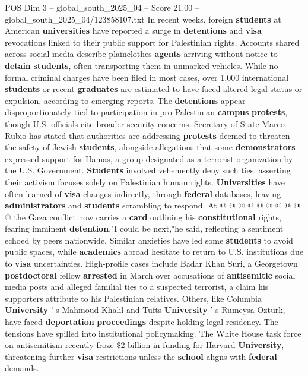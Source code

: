 \begin{textsample}{POS Dim 3 – global\_south\_2025\_04 – Score 21.00 – global\_south\_2025\_04/123858107.txt}  \label{ex:f3_pos_118}
In recent weeks, foreign \textbf{students} at American \textbf{universities} have reported a surge in \textbf{detentions} and \textbf{visa} revocations linked to their public support for Palestinian rights.
Accounts shared across social media describe plainclothes \textbf{agents} arriving without notice to \textbf{detain} \textbf{students}, often transporting them in unmarked vehicles.
While no formal criminal charges have been filed in most cases, over 1,000 international \textbf{students} or recent \textbf{graduates} are estimated to have faced altered legal status or expulsion, according to emerging reports.
The \textbf{detentions} appear disproportionately tied to participation in pro-Palestinian \textbf{campus} \textbf{protests}, though U.S. officials cite broader security concerns.
Secretary of State Marco Rubio has stated that authorities are addressing \textbf{protests} deemed to threaten the safety of Jewish \textbf{students}, alongside allegations that some \textbf{demonstrators} expressed support for Hamas, a group designated as a terrorist organization by the U.S.
Government. \textbf{Students} involved vehemently deny such ties, asserting their activism focuses solely on Palestinian human rights. \textbf{Universities} have often learned of \textbf{visa} changes indirectly, through \textbf{federal} databases, leaving \textbf{administrators} and \textbf{students} scrambling to respond.
At @ @ @ @ @ @ @ @ @ @ the Gaza conflict now carries a \textbf{card} outlining his \textbf{constitutional} rights, fearing imminent \textbf{detention}."I could be next,"he said, reflecting a sentiment echoed by peers nationwide.
Similar anxieties have led some \textbf{students} to avoid public spaces, while \textbf{academics} abroad hesitate to return to U.S. institutions due to \textbf{visa} uncertainties.
High-profile cases include Badar Khan Suri, a Georgetown \textbf{postdoctoral} fellow \textbf{arrested} in March over accusations of \textbf{antisemitic} social media posts and alleged familial ties to a suspected terrorist, a claim his supporters attribute to his Palestinian relatives.
Others, like Columbia \textbf{University} ' s Mahmoud Khalil and Tufts \textbf{University} ' s Rumeysa Ozturk, have faced \textbf{deportation} \textbf{proceedings} despite holding legal residency.
The tensions have spilled into institutional policymaking.
The White House task force on antisemitism recently froze \$2 billion in funding for Harvard \textbf{University}, threatening further \textbf{visa} restrictions unless the \textbf{school} aligns with \textbf{federal} demands.

\end{textsample}

